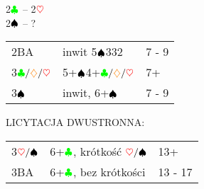 \documentclass[a4paper,11pt]{article}
\newcommand{\CC}{\textcolor{green}\clubsuit}
\newcommand{\DD}{\textcolor{orange}\diamondsuit}
\newcommand{\HH}{\textcolor{red}\heartsuit}
\newcommand{\PP}{\textcolor{black}\spadesuit}
\begin{document}
\begin{center}\LARGE{2$\CC$ -- 2$\HH$\\2$\PP$ -- ?}
\end{center}
\begin{tabular}{p{2cm} p{10cm} l}
	2BA & inwit 5$\PP$332\footnotemark[1] & 7 - 9\\
	3$\CC/\DD/\HH$ & 5+$\PP$4+$\CC/\DD/\HH$ & 7+\\
	3$\PP$ & inwit, 6+$\PP$ & 7 - 9\\
\end{tabular}

	
\newpage
\begin{center}\LARGE{LICYTACJA DWUSTRONNA:}\\
\end{center}

\begin{tabular}{p{2cm} p{10cm} l}
	3$\HH/\PP$ & 6+$\CC$, krótkość $\HH/\PP$ & 13+\\
	3BA & 6+$\CC$, bez krótkości & 13 - 17\\
\end{tabular}
\end{document}
